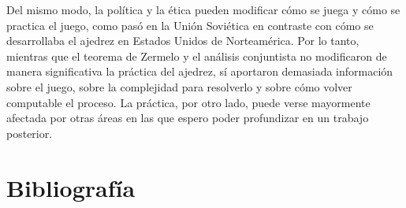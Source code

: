 \documentclass[twoside,openright,12pt,a4paper,spanish]{book}
\begin{document}
Del mismo modo, la pol\'itica y la \'etica pueden modificar c\'omo se juega y c\'omo se practica el juego, como pas\'o en la Uni\'on Sovi\'etica en contraste con c\'omo se desarrollaba el ajedrez en Estados Unidos de Norteam\'erica. Por lo tanto, mientras que el teorema de Zermelo y el an\'alisis conjuntista no modificaron de manera significativa la pr\'actica del ajedrez, sí aportaron demasiada informaci\'on sobre el juego, sobre la complejidad para resolverlo y sobre c\'omo volver computable el proceso. La pr\'actica, por otro lado, puede verse mayormente afectada por otras \'areas en las que espero poder profundizar en un trabajo posterior. 

\chapter*{Bibliografía}



\end{document}
